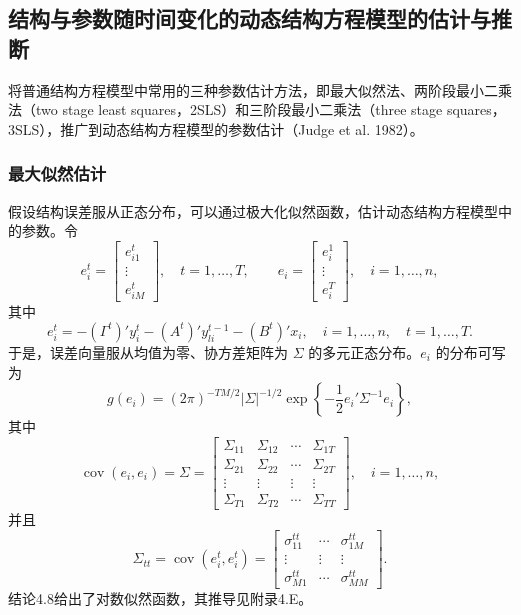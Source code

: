 \providecommand{\chFourBIddots}{\mathinner{\reflectbox{\ensuremath{\ddots}}}}
\subsection{结构与参数随时间变化的动态结构方程模型的估计与推断}

将普通结构方程模型中常用的三种参数估计方法，即最大似然法、两阶段最小二乘法（two stage least squares，2SLS）和三阶段最小二乘法（three stage squares，3SLS），推广到动态结构方程模型的参数估计（Judge et al. 1982）。

\subsubsection{最大似然估计}

假设结构误差服从正态分布，可以通过极大化似然函数，估计动态结构方程模型中的参数。令
\[
e_i^t=\begin{bmatrix}e_{i1}^t\\\vdots\\e_{iM}^t\end{bmatrix},
\quad t=1,\ldots,T,\qquad
e_i=\begin{bmatrix}e_i^1\\\vdots\\e_i^T\end{bmatrix},
\quad i=1,\ldots,n,
\]
其中
\[
e_i^t=-(\Gamma^t)'y_i^t-(A^t)'y_{li}^{t-1}-(B^t)'x_i,
\quad i=1,\ldots,n,\quad t=1,\ldots,T.
\]
于是，误差向量服从均值为零、协方差矩阵为 $\Sigma$ 的多元正态分布。$e_i$ 的分布可写为
\[
g(e_i)=(2\pi)^{-TM/2}|\Sigma|^{-1/2}
 \exp\left\{-\frac12e_i'\Sigma^{-1}e_i\right\},
\]
其中
\[
\operatorname{cov}(e_i,e_i)=\Sigma=
\begin{bmatrix}
\Sigma_{11}&\Sigma_{12}&\cdots&\Sigma_{1T}\\
\Sigma_{21}&\Sigma_{22}&\cdots&\Sigma_{2T}\\
\vdots&\vdots&\vdots&\vdots\\
\Sigma_{T1}&\Sigma_{T2}&\cdots&\Sigma_{TT}
\end{bmatrix},\quad i=1,\ldots,n,
\]
并且
\[
\Sigma_{tt}=\operatorname{cov}(e_i^t,e_i^t)=
\begin{bmatrix}
\sigma_{11}^{tt}&\cdots&\sigma_{1M}^{tt}\\
\vdots&\vdots&\vdots\\
\sigma_{M1}^{tt}&\cdots&\sigma_{MM}^{tt}
\end{bmatrix}.
\]
结论4.8给出了对数似然函数，其推导见附录4.E。


